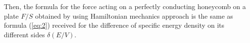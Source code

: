 \documentclass[twoside, 10pt]{article}
\begin{document}
\begin{multicols}{2}

    Then, the formula for the force acting on a
perfectly conducting honeycomb on a plate \({F}/{S}\) obtained by using Hamiltonian mechanics approach is the same as formula (\ref{eq:2})
received for the difference of specific energy density on its
different sides \(\delta\left({E}/{V}\right)\).




\end{multicols}
\end{document}
